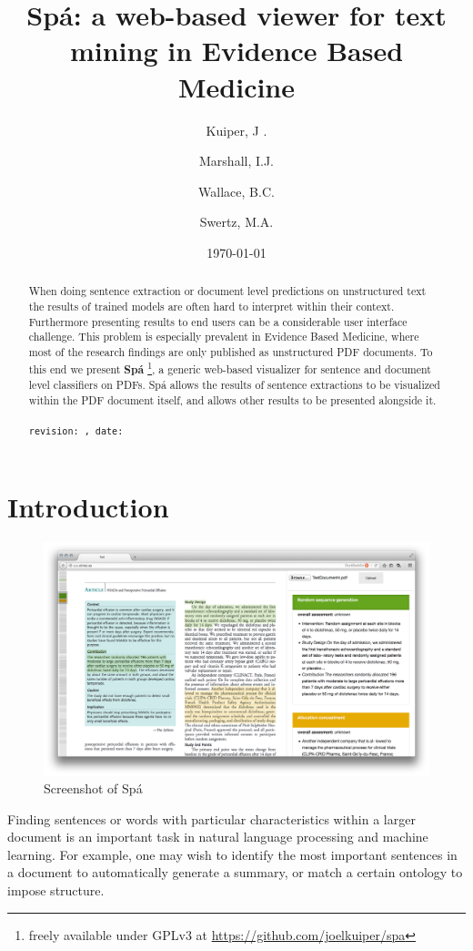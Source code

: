 \documentclass[runningheads,a4paper]{llncs}
\institute{University of Groningen \and Kings College London \and Brown University}
\author{Kuiper, J \inst{1}. \and Marshall, I.J. \inst{2} \and Wallace, B.C. \inst{3} \and Swertz, M.A. \inst{1}}
\date{\today}
\title{Spá: a web-based viewer for text mining in Evidence Based Medicine}
\begin{document}
\maketitle
\begin{abstract}
When doing sentence extraction or document level predictions on unstructured text the results of trained models are often hard to interpret within their context.
Furthermore presenting results to end users can be a considerable user interface challenge.
This problem is especially prevalent in Evidence Based Medicine, where most of the research findings are only published as unstructured PDF documents.
To this end we present \textbf{Spá}\cite{kuiper2014} \footnote{freely available under GPLv3 at \url{https://github.com/joelkuiper/spa}}, a generic web-based visualizer for sentence and document level classifiers on PDFs.
Spá allows the results of sentence extractions to be visualized within the PDF document itself, and allows other results to be presented alongside it.
\\
\\
\texttt{revision: \revision, date: \revisiondate}
\end{abstract}

\section{Introduction}
\label{sec-1}
\begin{figure}[htb]
\centering
\includegraphics[width=.9\linewidth]{./screenshot.png}
\caption{Screenshot of Spá}
\end{figure}

Finding sentences or words with particular characteristics within a larger document is an important task in natural language processing and machine learning.
For example, one may wish to identify the most important sentences in a document to automatically generate a summary, or match a certain ontology to impose structure.
\end{document}
